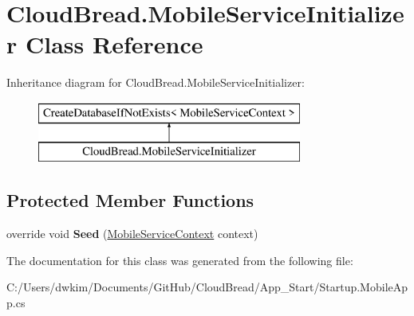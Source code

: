 \hypertarget{a00081}{}\section{Cloud\+Bread.\+Mobile\+Service\+Initializer Class Reference}
\label{a00081}
Inheritance diagram for Cloud\+Bread.\+Mobile\+Service\+Initializer\+:\begin{figure}[H]
\begin{center}
\leavevmode
\includegraphics[height=2.000000cm]{a00081}
\end{center}
\end{figure}
\subsection*{Protected Member Functions}
\begin{DoxyCompactItemize}
\item 
override void {\bfseries Seed} (\hyperlink{a00080}{Mobile\+Service\+Context} context)\hypertarget{a00081_ae60e6b723e7504c5be27b1f35b54501d}{}\label{a00081_ae60e6b723e7504c5be27b1f35b54501d}

\end{DoxyCompactItemize}


The documentation for this class was generated from the following file\+:\begin{DoxyCompactItemize}
\item 
C\+:/\+Users/dwkim/\+Documents/\+Git\+Hub/\+Cloud\+Bread/\+App\+\_\+\+Start/Startup.\+Mobile\+App.\+cs\end{DoxyCompactItemize}
